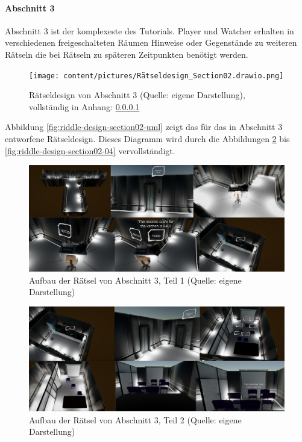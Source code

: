 \paragraph{Abschnitt 3}
Abschnitt 3 ist der komplexeste des Tutorials. Player und Watcher erhalten in verschiedenen freigeschalteten Räumen Hinweise oder Gegenstände zu weiteren Rätseln die bei Rätseln zu späteren Zeitpunkten benötigt werden.

\begin{figure}[ht]
\centering
\texttt{[image: content/pictures/Rätseldesign\_Section02.drawio.png]}
\caption{Rätseldesign von Abschnitt 3 (Quelle: eigene Darstellung), vollständig in Anhang: \ref{}}
\label{fig:r
iddle-design-section02-uml}
\end{figure}

Abbildung \ref{fig:riddle-design-section02-uml} zeigt das für das in Abschnitt 3 entworfene Rätseldesign. Dieses Diagramm wird durch die Abbildungen \ref{fig:riddle-design-section02-00} bis \ref{fig:riddle-design-section02-04} vervollständigt.

\begin{figure}[ht]
\centering
\includegraphics[width=1\linewidth]{content/pictures/Rätseldesign - Abschnitt02 - Rätsel00.png}
\caption{Aufbau der Rätsel von Abschnitt 3, Teil 1 (Quelle: eigene Darstellung)}
\label{fig:riddle-design-section02-00}
\end{figure}

\begin{figure}[ht]
\centering
\includegraphics[width=1\linewidth]{content/pictures/Rätseldesign - Abschnitt02 - Rätsel01.png}
\caption{Aufbau der Rätsel von Abschnitt 3, Teil 2 (Quelle: eigene Darstellung)}
\label{fig:riddle-design-section02-0l}
\end{figure}

